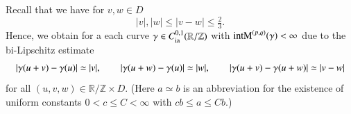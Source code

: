 \section{\secC}

Recall that we have for $v,w \in D$
\begin{equation*}
 |v|,|w| \leq |v-w| \leq \tfrac 2 3.
\end{equation*}
Hence,  we obtain for a each curve $\g \in \Cia[0,1](\mathbb R / \mathbb Z)$
with $\E(\g) < \infty $ due to the bi-Lipschitz estimate
\begin{equation*}
 |\g(u+v) - \g(u)| \simeq |v|, \quad \quad
 |\g(u+w) - \g(u)| \simeq |w|, \quad \quad
 |\g(u+v) - \g(u+w)| \simeq |v-w|
\end{equation*}
for all $(u,v,w) \in \mathbb R / \mathbb Z \times D$.
(Here $a\simeq b$ is an abbreviation for the existence of uniform
constants $0<c\le C<\infty$ with $cb\le a\le Cb$.)

